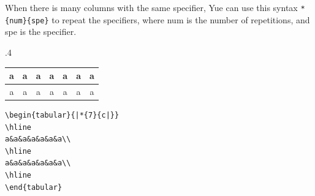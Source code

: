 When there is many columns with the same specifier, Yue can use this syntax \verb=*{num}{spe}= to repeat the specifiers, where num is the number of repetitions, and spe is the specifier.
\begin{miniexammar}{.4\textandmarginlen}{
\begin{tabular}{|*{7}{c|}}
\hline 
a&a&a&a&a&a&a\\
\hline
a&a&a&a&a&a&a\\
\hline
\end{tabular}
}
\begin{lstlisting}
\begin{tabular}{|*{7}{c|}}
\hline 
a&a&a&a&a&a&a\\
\hline
a&a&a&a&a&a&a\\
\hline
\end{tabular}
\end{lstlisting}
\end{miniexammar}

